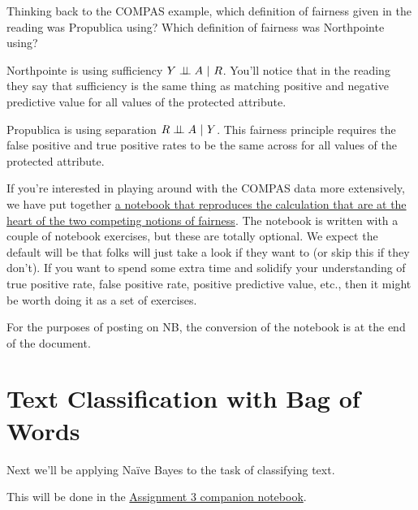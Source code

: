 \documentclass[assignment03_Solutions]{subfiles}
\begin{document}
\begin{exercise}[(10 minutes)]
Thinking back to the COMPAS example, which definition of fairness given in the reading was Propublica using?  Which definition of fairness was Northpointe using?

\begin{boxedsolution}
\bi
\item Northpointe is using sufficiency $Y \perp\!\!\!\perp A~|~R$.  You'll notice that in the reading they say that sufficiency is the same thing as matching positive and negative predictive value for all values of the protected attribute.
\item Propublica is using separation $R \perp\!\!\!\perp A~|~Y$.  This fairness principle requires the false positive and true positive rates to be the same across for all values of the protected attribute.
\ei
\end{boxedsolution}
\end{exercise}

If you're interested in playing around with the COMPAS data more extensively, we have put together \href{https://colab.research.google.com/github/mlfa19/assignments/blob/master/Module\%202/03/Exploring_COMPAS_Data.ipynb}{a notebook that reproduces the calculation that are at the heart of the two competing notions of fairness}.  The notebook is written with a couple of notebook exercises, but these are totally optional.  We expect the default will be that folks will just take a look if they want to (or skip this if they don't). If you want to spend some extra time and solidify your understanding of true positive rate, false positive rate, positive predictive value, etc., then it might be worth doing it as a set of exercises.

For the purposes of posting on NB, the conversion of the notebook is at the end of the document.

\section{Text Classification with Bag of Words}
Next we'll be applying Na\"ive Bayes to the task of classifying text.

\begin{externalresources}[(60 minutes)]
This will be done in the \href{https://colab.research.google.com/github/mlfa19/assignments/blob/master/Module\%202/03/Assignment_3_Companion_Notebook.ipynb}{Assignment 3 companion notebook}.
\end{externalresources}
\end{document}
